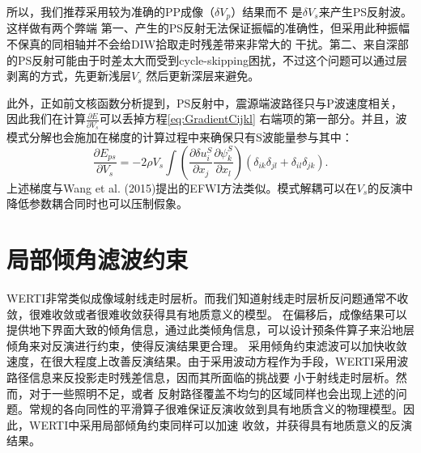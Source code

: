 所以，我们推荐采用较为准确的PP成像（$\delta V_p$）结果而不
是$\delta V_s$来产生PS反射波。这样做有两个弊端
第一、产生的PS反射无法保证振幅的准确性，但采用此种振幅不保真的同相轴并不会给DIW拾取走时残差带来非常大的
干扰。第二、来自深部的PS反射可能由于时差太大而受到cycle-skipping困扰，不过这个问题可以通过层剥离的方式，先更新浅层$V_s$
然后更新深层来避免。

此外，正如前文核函数分析提到，PS反射中，震源端波路径只与P波速度相关，
因此我们在计算$\frac{\partial E}{\partial V_s}$可以丢掉方程\eqref{eq:GradientCijkl} 
右端项的第一部分。并且，波模式分解也会施加在梯度的计算过程中来确保只有S波能量参与其中：
\begin{equation}
    \frac{\partial E_{ps}}{\partial V_s}=-2\rho V_s
    \int (\frac{\partial \delta u^S_{i}}{\partial
    x_j}\frac{\partial \psi^S_{k}}{\partial x_l})
    (\delta_{ik}\delta_{jl}+
    \delta_{il}\delta_{jk}).
    \label{eq:GradientVel}
\end{equation}
上述梯度与Wang et al. (2015)\cite{Wang2015a}提出的EFWI方法类似。模式解耦可以在$V_s$的反演中降低参数耦合同时也可以压制假象。

\section{局部倾角滤波约束}
WERTI非常类似成像域射线走时层析。而我们知道射线走时层析反问题通常不收敛，很难收敛或者很难收敛获得具有地质意义的模型。
在偏移后，成像结果可以提供地下界面大致的倾角信息，通过此类倾角信息，可以设计预条件算子来沿地层倾角来对反演进行约束，使得反演结果更合理。
采用倾角约束滤波可以加快收敛速度，在很大程度上改善反演结果。由于采用波动方程作为手段，WERTI采用波路径信息来反投影走时残差信息，因而其所面临的挑战要
小于射线走时层析。然而，对于一些照明不足，或者
反射路径覆盖不均匀的区域同样也会出现上述的问题。常规的各向同性的平滑算子很难保证反演收敛到具有地质含义的物理模型。因此，WERTI中采用局部倾角约束同样可以加速
收敛，并获得具有地质意义的反演结果。


